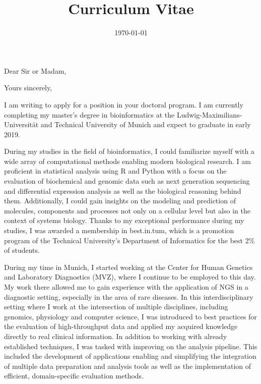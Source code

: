 \documentclass[11pt,a4paper,sans]{moderncv} %
\title{Curriculum Vitae}
\begin{document}
	
	
	\ifdefined\showletter
	\clearpage
	\enlargethispage{12pt}
	\date{\today} %
	\opening{Dear Sir or Madam,} %
	\closing{Yours sincerely,} %
	
	\makelettertitle %
	\justify
	I am writing to apply for a position in your doctoral program.
	I am currently completing my master's degree in bioinformatics at the Ludwig-Maximilians-Universität and Technical University of Munich and expect to graduate in early 2019.
	
	During my studies in the field of bioinformatics, I could familiarize myself with a wide array of computational methods enabling modern biological research.
	I am proficient in statistical analysis using R and Python with a focus on the evaluation of biochemical and genomic data such as next generation sequencing and differential expression analysis as well as the biological reasoning behind them.
	Additionally, I could gain insights on the modeling and prediction of molecules, components and processes not only on a cellular level but also in the context of systems biology.
	Thanks to my exceptional performance during my studies, I was awarded a membership in best.in.tum, which is a promotion program of the Technical University's Department of Informatics for the best 2\% of students.
	
	During my time in Munich, I started working at the Center for Human Genetics and Laboratory Diagnostics (MVZ), where I continue to be employed to this day.
	My work there allowed me to gain experience with the application of NGS in a diagnostic setting, especially in the area of rare diseases.
	In this interdisciplinary setting where I work at the intersection of multiple disciplines, including genomics, physiology and computer science, I was introduced to best practices for the evaluation of high-throughput data and applied my acquired knowledge directly to real clinical information.
	In addition to working with already established techniques, I was tasked with improving on the analysis pipeline.
	This included the development of applications enabling and simplifying the integration of multiple data preparation and analysis tools as well as the implementation of efficient, domain-specific evaluation methods.
	
\end{document}
